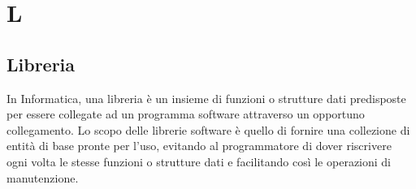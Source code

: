 \section*{L}

\subsection{Libreria}
In Informatica, una libreria è un insieme di funzioni o strutture dati predisposte per essere collegate ad un programma software attraverso un opportuno collegamento.
Lo scopo delle librerie software è quello di fornire una collezione di entità di base pronte per l'uso, evitando al programmatore di dover riscrivere ogni volta le stesse funzioni o strutture dati e facilitando così le operazioni di manutenzione. 